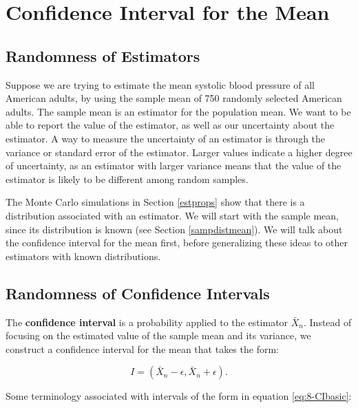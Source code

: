\documentclass[
]{book}
\begin{document}
\section{Confidence Interval for the Mean}\label{confidence-interval-for-the-mean}

\subsection{Randomness of Estimators}\label{randomness-of-estimators}

Suppose we are trying to estimate the mean systolic blood pressure of all American adults, by using the sample mean of 750 randomly selected American adults. The sample mean is an estimator for the population mean. We want to be able to report the value of the estimator, as well as our uncertainty about the estimator. A way to measure the uncertainty of an estimator is through the variance or standard error of the estimator. Larger values indicate a higher degree of uncertainty, as an estimator with larger variance means that the value of the estimator is likely to be different among random samples.

The Monte Carlo simulations in Section \ref{estprops} show that there is a distribution associated with an estimator. We will start with the sample mean, since its distribution is known (see Section \ref{sampdistmean}). We will talk about the confidence interval for the mean first, before generalizing these ideas to other estimators with known distributions.

\subsection{Randomness of Confidence Intervals}\label{randomness-of-confidence-intervals}

The \textbf{confidence interval} is a probability applied to the estimator \(\bar{X}_n\). Instead of focusing on the estimated value of the sample mean and its variance, we construct a confidence interval for the mean that takes the form:

\begin{equation} 
I = \left(\bar{X}_n - \epsilon, \bar{X}_n + \epsilon \right).
\label{eq:8-CIbasic}
\end{equation}

Some terminology associated with intervals of the form in equation \eqref{eq:8-CIbasic}:
\end{document}

